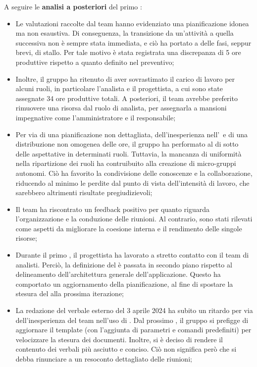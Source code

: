 \vspace{0.5\baselineskip}
\par A seguire le \textbf{analisi a posteriori} del primo :
\begin{itemize}
  \item Le valutazioni raccolte dal team hanno evidenziato una pianificazione idonea ma non esaustiva. Di conseguenza, la transizione da un'attività a quella successiva non è sempre stata immediata, e ciò ha portato a delle fasi, seppur brevi, di stallo. Per tale motivo è stata registrata una discrepanza di 5 ore produttive rispetto a quanto definito nel preventivo;
  \item Inoltre, il gruppo ha ritenuto di aver sovrastimato il carico di lavoro per alcuni ruoli, in particolare l'analista e il progettista, a cui sono state assegnate 34 ore produttive totali. A posteriori, il team avrebbe preferito rimuovere una risorsa dal ruolo di analista, per assegnarla a mansioni impegnative come l'amministratore e il responsabile;
  \item Per via di una pianificazione non dettagliata, dell'inesperienza nell'\AdR\ e di una distribuzione non omogenea delle ore, il gruppo ha performato al di sotto delle aspettative in determinati ruoli. Tuttavia, la mancanza di uniformità nella ripartizione dei ruoli ha contruibuito alla creazione di micro-gruppi autonomi. Ciò ha favorito la condivisione delle conoscenze e la collaborazione, riducendo al minimo le perdite dal punto di vista dell'intensità di lavoro, che sarebbero altrimenti risultate pregiudizievoli;
  \item Il team ha riscontrato un feedback positivo per quanto riguarda l'organizzazione e la conduzione delle riunioni. Al contrario, sono stati rilevati come aspetti da migliorare la coesione interna e il rendimento delle singole risorse;
  \item Durante il primo , il progettista ha lavorato a stretto contatto con il team di analisti. Perciò, la definizione del  è passata in secondo piano rispetto al delineamento dell'architettura generale dell'applicazione. Questo ha comportato un aggiornamento della pianificazione, al fine di spostare la stesura del  alla prossima iterazione;
  \item La redazione del verbale esterno del 3 aprile 2024 ha subito un ritardo per via dell'inesperienza del team nell'uso di . Dal prossimo , il gruppo si prefigge di aggiornare il template  (con l'aggiunta di parametri e comandi predefiniti) per velocizzare la stesura dei documenti. Inoltre, si è deciso di rendere il contenuto dei verbali più asciutto e conciso. Ciò non significa però che si debba rinunciare a un resoconto dettagliato delle riunioni;

\end{itemize}
